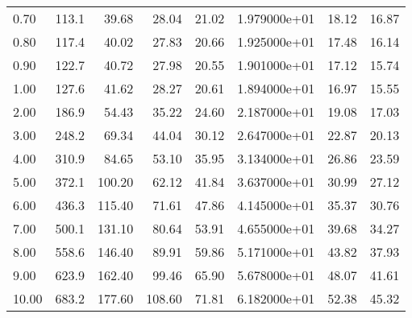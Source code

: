 \begin{tabular}{lrrrrrrr}
0.70  &     113.1 &       39.68 &        28.04 &        21.02 &  1.979000e+01 &       18.12 &       16.87 \\
0.80  &     117.4 &       40.02 &        27.83 &        20.66 &  1.925000e+01 &       17.48 &       16.14 \\
0.90  &     122.7 &       40.72 &        27.98 &        20.55 &  1.901000e+01 &       17.12 &       15.74 \\
1.00  &     127.6 &       41.62 &        28.27 &        20.61 &  1.894000e+01 &       16.97 &       15.55 \\
2.00  &     186.9 &       54.43 &        35.22 &        24.60 &  2.187000e+01 &       19.08 &       17.03 \\
3.00  &     248.2 &       69.34 &        44.04 &        30.12 &  2.647000e+01 &       22.87 &       20.13 \\
4.00  &     310.9 &       84.65 &        53.10 &        35.95 &  3.134000e+01 &       26.86 &       23.59 \\
5.00  &     372.1 &      100.20 &        62.12 &        41.84 &  3.637000e+01 &       30.99 &       27.12 \\
6.00  &     436.3 &      115.40 &        71.61 &        47.86 &  4.145000e+01 &       35.37 &       30.76 \\
7.00  &     500.1 &      131.10 &        80.64 &        53.91 &  4.655000e+01 &       39.68 &       34.27 \\
8.00  &     558.6 &      146.40 &        89.91 &        59.86 &  5.171000e+01 &       43.82 &       37.93 \\
9.00  &     623.9 &      162.40 &        99.46 &        65.90 &  5.678000e+01 &       48.07 &       41.61 \\
10.00 &     683.2 &      177.60 &       108.60 &        71.81 &  6.182000e+01 &       52.38 &       45.32 \\
\bottomrule
\end{tabular}
